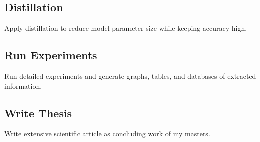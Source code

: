 \documentclass[a4paper,12pt]{article}
\begin{document}
\subsection{Distillation}
Apply distillation \cite{sun_patient_2019} to reduce model parameter size while
keeping accuracy high.

\subsection{Run Experiments}
Run detailed experiments and generate graphs, tables, and databases of extracted information.

\subsection{Write Thesis}
Write extensive scientific article as concluding work of my masters.


 
\end{document}
